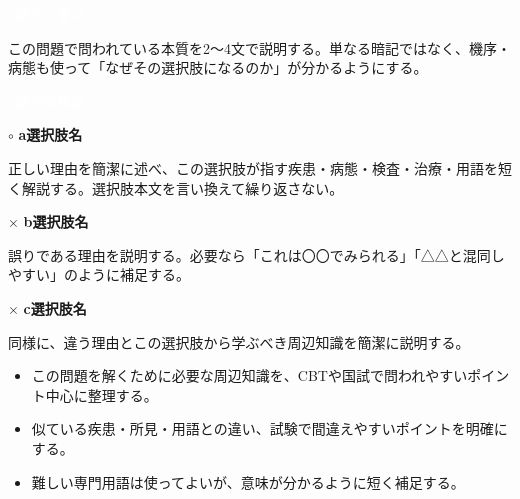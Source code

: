 \documentclass[a4paper,11pt]{article}
\newcommand{\ExplainHeading}[1]{%
  \par\medskip\noindent
  \begingroup
  \setlength{\fboxsep}{2pt}%
  \colorbox{primaryColor}{\textcolor{white}{\bfseries\strut\ #1\ }}%
  \endgroup
  \par\smallskip
}
\newcommand{\ChoiceExplanationSymbol}[1]{%
  \ifstrequal{#1}{correct}{$\circ$}{$\times$}%
}
\newcommand{\ChoiceExplanation}[4]{%
  \par\smallskip\noindent
  {\small
    \ChoiceExplanationSymbol{#2}\hspace{0.45em}%
    {\bfseries #1\quad #3}\par
    \noindent #4\par
  }%
}
\newcommand{\BasicMatterTitle}[1]{%
  \par\noindent{\small\bfseries #1}\par\smallskip
}
\begin{document}
\begin{ExplanationBox}

  \ExplainHeading{解法の要点}
  この問題で問われている本質を2〜4文で説明する。単なる暗記ではなく、機序・病態も使って「なぜその選択肢になるのか」が分かるようにする。

  \ExplainHeading{選択肢解説}
  \ChoiceExplanation{a}{correct}{選択肢名}{正しい理由を簡潔に述べ、この選択肢が指す疾患・病態・検査・治療・用語を短く解説する。選択肢本文を言い換えて繰り返さない。}
  \ChoiceExplanation{b}{wrong}{選択肢名}{誤りである理由を説明する。必要なら「これは〇〇でみられる」「△△と混同しやすい」のように補足する。}
  \ChoiceExplanation{c}{wrong}{選択肢名}{同様に、違う理由とこの選択肢から学ぶべき周辺知識を簡潔に説明する。}

  \begin{BasicMatterBox}
    \BasicMatterTitle{基本事項}
    \begin{itemize}[leftmargin=1.2em]
      \item この問題を解くために必要な周辺知識を、CBTや国試で問われやすいポイント中心に整理する。
      \item 似ている疾患・所見・用語との違い、試験で間違えやすいポイントを明確にする。
      \item 難しい専門用語は使ってよいが、意味が分かるように短く補足する。
    \end{itemize}
  \end{BasicMatterBox}
\end{ExplanationBox}

\end{document}
